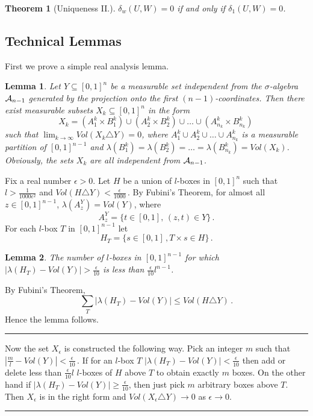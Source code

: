 \documentclass [11pt] {article}
\newcommand{\qed} {\hspace {0.1in} \rule {1.5mm} {3.5mm}}
\newtheorem{lemma}{Lemma}[section]
\newtheorem{theorem}{Theorem}
\def\proof{\smallskip\noindent{\it Proof.} }
\def\cA{\mbox{$\cal A$}}
\def\cA{\mbox{$\cal A$}}
\def\to{\rightarrow}
\begin{document}
\begin{theorem}[Uniqueness II.] \label{uni2} $\delta_w(U,W)=0$ if and only 
if $\delta_1(U,W)=0$.
\end{theorem}
\subsection{Technical Lemmas}
First we prove a simple real analysis lemma.
\begin{lemma} \label{lemmafontos}
Let $Y\subseteq [0,1]^n$ be a measurable
 set independent from the $\sigma$-algebra
$\cA_{n-1}$ generated by the projection onto
the first $(n-1)$-coordinates. Then there exist measurable
subsets $X_k\subseteq [0,1]^n$
in the form 
$$X_k=(A^k_1\times B^k_1)\cup(A^k_2\times B^k_2)\cup\dots\cup 
(A^k_{n_k}\times B^k_{n_k})\,$$ such that
$\lim_{k\to\infty} Vol(X_k\triangle Y)=0$,
where
$A^k_1\cup A^k_2\cup\dots\cup A^k_{n_k}$ is
a measurable partition of $[0,1]^{n-1}$ and $\lambda(B^k_1)=
\lambda(B^k_2)=\dots=\lambda(B^k_{n_k})=Vol(X_k)$.
Obviously, the sets $X_k$ are all independent from $\cA_{n-1}$.
\end{lemma}
\proof
Fix a real number $\epsilon>0$. Let $H$ be a union of $l$-boxes
in $[0,1]^n$ such that $l>\frac{1}{1000\epsilon^2}$ and
$Vol(H\triangle Y)<\frac{\epsilon}{1000}\,.$
By Fubini's Theorem, for almost all $z\in[0,1]^{n-1}$,
$\lambda(A_z^Y)=Vol(Y)$, where
$$A^Y_z=\{t\in [0,1], \,(z,t)\in Y\}\,.$$
For each $l$-box $T$ in $[0,1]^{n-1}$ let 
$$H_T=\{s\in [0,1]\,,T\times s\in H\}\,.$$

\begin{lemma}
The number of $l$-boxes in $[0,1]^{n-1}$ for which
$|\lambda(H_T)-Vol(Y)|>\frac{\epsilon}{10}$ is less than
$\frac{\epsilon}{10} l^{n-1}$.
\end{lemma}
\proof
By Fubini's Theorem,
$$\sum_T |\lambda(H_T)-Vol(Y)|\leq Vol(H\triangle Y)\,.$$
Hence the lemma follows. \qed

\bigskip
\noindent
Now the set $X_\epsilon$ is constructed the following way.
Pick an integer $m$ such that 
$|\frac{m}{l}-Vol(Y)|<\frac{\epsilon}{10}\,.$
If for an $l$-box $T$ $|\lambda(H_T)-Vol(Y)|<\frac{\epsilon}{10}$
then add or delete less than $\frac{\epsilon}{10}l$
 $l$-boxes of $H$ above $T$ to obtain exactly $m$ boxes. On the other hand
if $|\lambda(H_T)-Vol(Y)|\geq\frac{\epsilon}{10}$, then
just pick $m$ arbitrary boxes above $T$. Then $X_\epsilon$
is in the right form and $Vol(X_\epsilon\triangle Y)\to 0$ as $\epsilon\to 0$.
\qed
\end{document}
